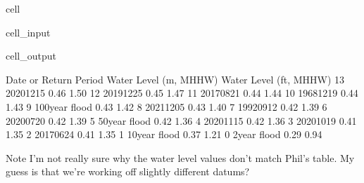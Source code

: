 \documentclass[letterpaper,10pt,english]{jupyterBook}
\begin{document}
\begin{sphinxuseclass}{cell}
\begin{sphinxVerbatimInput}
\begin{sphinxuseclass}{cell_input}
\begin{sphinxVerbatim}[commandchars=\\\{\}]
    \PYG{p}{[}\PYG{p}{]}  
   


\end{sphinxVerbatim}

\end{sphinxuseclass}\end{sphinxVerbatimInput}
\begin{sphinxVerbatimOutput}

\begin{sphinxuseclass}{cell_output}
\begin{sphinxVerbatim}[commandchars=\\\{\}]
   Date or Return Period  Water Level (m, MHHW)  Water Level (ft, MHHW)
13            2020\PYGZhy{}12\PYGZhy{}15                   0.46                    1.50
12            2019\PYGZhy{}12\PYGZhy{}25                   0.45                    1.47
11            2017\PYGZhy{}08\PYGZhy{}21                   0.44                    1.44
10            1968\PYGZhy{}12\PYGZhy{}19                   0.44                    1.43
9         100\PYGZhy{}year flood                   0.43                    1.42
8             2021\PYGZhy{}12\PYGZhy{}05                   0.43                    1.40
7             1992\PYGZhy{}09\PYGZhy{}12                   0.42                    1.39
6             2020\PYGZhy{}07\PYGZhy{}20                   0.42                    1.39
5          50\PYGZhy{}year flood                   0.42                    1.36
4             2020\PYGZhy{}11\PYGZhy{}15                   0.42                    1.36
3             2020\PYGZhy{}10\PYGZhy{}19                   0.41                    1.35
2             2017\PYGZhy{}06\PYGZhy{}24                   0.41                    1.35
1          10\PYGZhy{}year flood                   0.37                    1.21
0           2\PYGZhy{}year flood                   0.29                    0.94
\end{sphinxVerbatim}

\end{sphinxuseclass}\end{sphinxVerbatimOutput}

\end{sphinxuseclass}
\sphinxAtStartPar
Note I’m not really sure why the water level values don’t match Phil’s table. My guess is that we’re working off slightly different datums?
\end{document}
